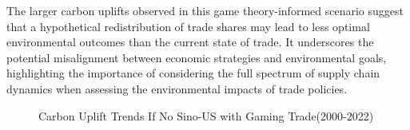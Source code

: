  The larger carbon uplifts observed in this game theory-informed scenario suggest that a hypothetical redistribution of trade shares may lead to less optimal environmental outcomes than the current state of trade. It underscores the potential misalignment between economic strategies and environmental goals, highlighting the importance of considering the full spectrum of supply chain dynamics when assessing the environmental impacts of trade policies.
 \ifincludefigures
 \begin{figure}
  \centering
  \caption{Carbon Uplift Trends If No Sino-US with Gaming Trade(2000-2022)}\label{fig:Carbon Uplift Trends If No Sino-US with Gaming Trade(2000-2022)}
 \end{figure}
\fi



